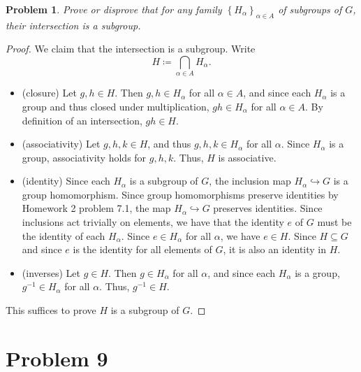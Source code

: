 \documentclass[11pt, letterpaper]{article}
\theoremstyle{plain}
\newtheorem{problem}{Problem}[section]
\begin{document}
\begin{problem}\label{8.2}
	Prove or disprove that for any family $\left\{ H_\alpha  \right\}_{\alpha \in A} $ of subgroups of $G$, their intersection is a subgroup.
\end{problem}
\begin{proof}
	We claim that the intersection is a subgroup. Write
	\[
		H\coloneqq \bigcap_{\alpha \in A} H_\alpha 
	.\]
	\begin{itemize}
		\item (closure) Let $g,h\in H$. Then $g,h\in H_\alpha $ for all $\alpha \in A$, and since each $H_\alpha $ is a group and thus closed under multiplication, $gh\in H_\alpha $ for all $\alpha \in A$. By definition of an intersection, $gh\in H$.
		\item (associativity) Let $g,h,k\in H$, and thus $g,h,k\in H_\alpha $ for all $\alpha $. Since $H_\alpha $ is a group, associativity holds for $g,h,k$. Thus, $H$ is associative.
		\item (identity) Since each $H_\alpha $ is a subgroup of $G$, the inclusion map $H_\alpha \hookrightarrow G$ is a group homomorphism. Since group homomorphisms preserve identities by Homework 2 problem 7.1, the map $H_\alpha \hookrightarrow G$ preserves identities. Since inclusions act trivially on elements, we have that the identity $e$ of $G$ must be the identity of each $H_\alpha $. Since $e\in H_\alpha $ for all $\alpha $, we have $e\in H$. Since $H\subseteq G$ and since $e$ is the identity for all elements of $G$, it is also an identity in $H$.
		\item (inverses) Let $g\in H$. Then $g\in H_\alpha $ for all $\alpha $, and since each $H_\alpha $ is a group, $g^{-1} \in H_\alpha $ for all $\alpha $. Thus, $g^{-1} \in H$.
	\end{itemize}
	This suffices to prove $H$ is a subgroup of $G$.
\end{proof}


\section{Problem 9}
\end{document}
